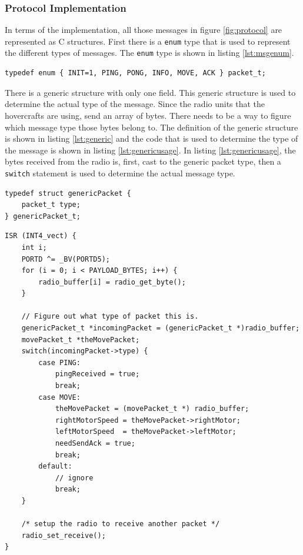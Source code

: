\subsubsection{Protocol Implementation}
In terms of the implementation, all those messages in figure \ref{fig:protocol}
are represented as C structures. First there is a \texttt{enum} type that is
used to represent the different types of messages. The \texttt{enum} type is
shown in listing \ref{lst:msgenum}.
\begin{lstlisting}[caption={Enumerations for message types},
                   label=lst:msgenum]
typedef enum { INIT=1, PING, PONG, INFO, MOVE, ACK } packet_t;
\end{lstlisting}
There is a generic structure with only one field. This generic structure is used
to determine the actual type of the message. Since the radio units that the
hovercrafts are using, send an array of bytes. There needs to be a way to figure
which message type those bytes belong to. The definition of the generic
structure is shown in listing \ref{lst:generic} and the code that is used to
determine the type of the message is shown in listing \ref{lst:genericusage}. In
listing \ref{lst:genericusage}, the bytes received from the radio is, first,
cast to the generic packet type, then a \texttt{switch} statement is used to
determine the actual message type.
\begin{lstlisting}[label=lst:generic,float,
                   caption={Generic Packet Structure}]
typedef struct genericPacket {
    packet_t type;
} genericPacket_t;
\end{lstlisting}
\begin{lstlisting}[label=lst:genericusage,float,
                   caption={Packets Casting}]
ISR (INT4_vect) {
    int i;
    PORTD ^= _BV(PORTD5);
    for (i = 0; i < PAYLOAD_BYTES; i++) {
        radio_buffer[i] = radio_get_byte();
    }
    
    // Figure out what type of packet this is.
    genericPacket_t *incomingPacket = (genericPacket_t *)radio_buffer;
    movePacket_t *theMovePacket;
    switch(incomingPacket->type) {
        case PING:
            pingReceived = true;
            break;
        case MOVE:
            theMovePacket = (movePacket_t *) radio_buffer;
            rightMotorSpeed = theMovePacket->rightMotor;
            leftMotorSpeed  = theMovePacket->leftMotor;
            needSendAck = true;
            break;
        default:
            // ignore
            break;
    }
    
    /* setup the radio to receive another packet */
    radio_set_receive();
}
\end{lstlisting}
